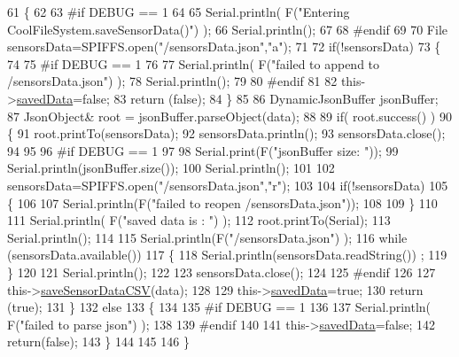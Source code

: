 \begin{DoxyCode}
61 \{
62 
63 \textcolor{preprocessor}{#if DEBUG == 1}
64 
65     Serial.println( F(\textcolor{stringliteral}{"Entering CoolFileSystem.saveSensorData()"}) );
66     Serial.println();
67 
68 \textcolor{preprocessor}{#endif}
69     
70     File sensorsData=SPIFFS.open(\textcolor{stringliteral}{"/sensorsData.json"},\textcolor{stringliteral}{"a"});
71 
72     \textcolor{keywordflow}{if}(!sensorsData)
73     \{
74     
75 \textcolor{preprocessor}{    #if DEBUG == 1}
76     
77         Serial.println( F(\textcolor{stringliteral}{"failed to append to /sensorsData.json"}) );
78         Serial.println();
79     
80 \textcolor{preprocessor}{    #endif}
81 
82         this->\hyperlink{classCoolFileSystem_ad398e0c5c41a0c88acdf5d672aa71351}{savedData}=\textcolor{keyword}{false};
83         \textcolor{keywordflow}{return} (\textcolor{keyword}{false}); 
84     \}   
85 
86     DynamicJsonBuffer jsonBuffer;
87     JsonObject& root = jsonBuffer.parseObject(data);
88 
89     \textcolor{keywordflow}{if}( root.success() )
90     \{
91         root.printTo(sensorsData);
92         sensorsData.println();
93         sensorsData.close();
94 
95 
96 \textcolor{preprocessor}{    #if DEBUG == 1}
97         
98         Serial.print(F(\textcolor{stringliteral}{"jsonBuffer size: "}));
99         Serial.println(jsonBuffer.size());
100         Serial.println();
101 
102         sensorsData=SPIFFS.open(\textcolor{stringliteral}{"/sensorsData.json"},\textcolor{stringliteral}{"r"});
103         
104         \textcolor{keywordflow}{if}(!sensorsData)
105         \{
106             
107             Serial.println(F(\textcolor{stringliteral}{"failed to reopen /sensorsData.json"}));
108                         
109         \}
110     
111         Serial.println( F(\textcolor{stringliteral}{"saved data is : "}) );
112         root.printTo(Serial);
113         Serial.println();
114 
115         Serial.println(F(\textcolor{stringliteral}{"/sensorsData.json"}) );
116         \textcolor{keywordflow}{while} (sensorsData.available()) 
117         \{
118             Serial.println(sensorsData.readString()) ;
119         \}
120         
121         Serial.println();
122         
123         sensorsData.close();
124     
125 \textcolor{preprocessor}{    #endif}
126 
127         this->\hyperlink{classCoolFileSystem_ab78704d5d21ce10fc6f1138ab5ab46c8}{saveSensorDataCSV}(data);     
128 
129         this->\hyperlink{classCoolFileSystem_ad398e0c5c41a0c88acdf5d672aa71351}{savedData}=\textcolor{keyword}{true};
130         \textcolor{keywordflow}{return} (\textcolor{keyword}{true});      
131     \}
132     \textcolor{keywordflow}{else}
133     \{
134     
135 \textcolor{preprocessor}{    #if DEBUG == 1}
136 
137         Serial.println( F(\textcolor{stringliteral}{"failed to parse json"}) );
138     
139 \textcolor{preprocessor}{    #endif}
140 
141         this->\hyperlink{classCoolFileSystem_ad398e0c5c41a0c88acdf5d672aa71351}{savedData}=\textcolor{keyword}{false};
142         \textcolor{keywordflow}{return}(\textcolor{keyword}{false});
143     \}
144     
145 
146 \}
\end{DoxyCode}
